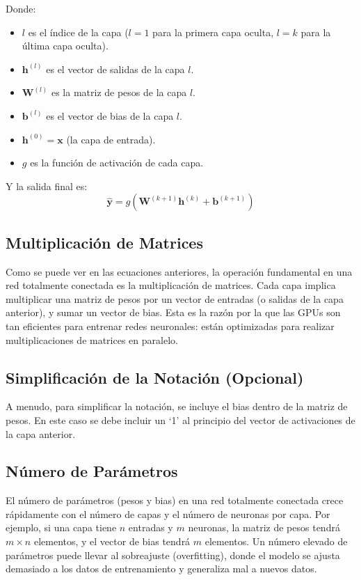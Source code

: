 \documentclass{article}
\begin{document}
Donde:

\begin{itemize}
    \item \(l\) es el índice de la capa (\(l = 1\) para la primera capa oculta, \(l = k\) para la última capa oculta).
    \item \(\mathbf{h}^{(l)}\) es el vector de salidas de la capa \(l\).
    \item \(\mathbf{W}^{(l)}\) es la matriz de pesos de la capa \(l\).
    \item \(\mathbf{b}^{(l)}\) es el vector de bias de la capa \(l\).
    \item \(\mathbf{h}^{(0)} = \mathbf{x}\) (la capa de entrada).
    \item  \(g\) es la función de activación de cada capa.
\end{itemize}
Y la salida final es:
\[
\hat{\mathbf{y}} = g(\mathbf{W}^{(k+1)} \mathbf{h}^{(k)} + \mathbf{b}^{(k+1)})
\]

\subsection{Multiplicación de Matrices}
Como se puede ver en las ecuaciones anteriores, la operación fundamental en una red totalmente conectada es la multiplicación de matrices.  Cada capa implica multiplicar una matriz de pesos por un vector de entradas (o salidas de la capa anterior), y sumar un vector de bias.  Esta es la razón por la que las GPUs son tan eficientes para entrenar redes neuronales: están optimizadas para realizar multiplicaciones de matrices en paralelo.

\subsection{Simplificación de la Notación (Opcional)}

A menudo, para simplificar la notación, se incluye el bias dentro de la matriz de pesos. En este caso se debe incluir un `1' al principio del vector de activaciones de la capa anterior.

\subsection{Número de Parámetros}
El número de parámetros (pesos y bias) en una red totalmente conectada crece rápidamente con el número de capas y el número de neuronas por capa.  Por ejemplo, si una capa tiene \(n\) entradas y \(m\) neuronas, la matriz de pesos tendrá \(m \times n\) elementos, y el vector de bias tendrá \(m\) elementos. Un número elevado de parámetros puede llevar al sobreajuste (overfitting), donde el modelo se ajusta demasiado a los datos de entrenamiento y generaliza mal a nuevos datos.
\end{document}
